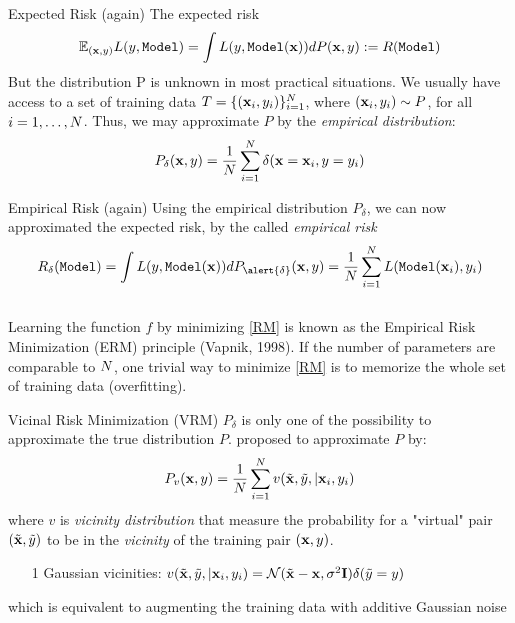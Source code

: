 \documentclass[xcolor=pdftex,dvipsnames,table,mathserif]{beamer}
\begin{document}
\begin{frame}{Expected Risk (again)}
The expected risk
\begin{equation*}
 \mathbb{E}_{(\mathbf{x},y)}  L(y,\texttt{Model}) =  \int L(y,\texttt{Model} (\mathbf{x})) dP(\mathbf{x},y) := R(\texttt{Model} )
\end{equation*}
\pause
But the distribution P is \alert{unknown} in most practical situations. 
\pause
We usually have access to a set of training data $T=\{(\mathbf{x}_i,y_i) \}_{i=1}^{N}$, where $(\mathbf{x}_i,y_i)\sim P$, for all $i=1,\ldots,N$. Thus, we may approximate $P$ by the \emph{empirical distribution}:
\begin{equation*}
P_{\delta}(\mathbf{x},y) = \frac{1}{N}\sum_{i=1}^{N}\delta(\mathbf{x}=\mathbf{x}_i,y=y_i)
\end{equation*}
\end{frame}

\begin{frame}{Empirical Risk (again)}
Using the empirical distribution $P_{\delta}$, we can now approximated the expected risk, by the called \emph{empirical risk}
\begin{equation}\label{RM}
R_{\delta}(\texttt{Model} ) = \int \loss(y,\texttt{Model} (\x)) dP_{\alert{\delta}}(\x,y) = \frac{1}{\nsize}\sum_{i=1}^{\nsize}\loss(\texttt{Model}(\x_i),y_i)
\end{equation} \\
Learning the function $f$ by minimizing \eqref{RM} is known as the Empirical Risk Minimization (ERM) principle \cite{vapnik98} (Vapnik, 1998). If the number of parameters are comparable to $N$, one trivial way to minimize \eqref{RM} is to \alert{memorize} the whole set of training data (overfitting).
\end{frame}

\begin{frame}{Vicinal Risk Minimization (VRM)}
$P_{\delta}$ is only one of the possibility to approximate the true distribution $P$. \cite{chapelle2001vicinal} proposed to approximate $P$ by:
\begin{equation*}
P_{v}(\mathbf{x},y) = \frac{1}{N}\sum_{i=1}^{N}v(\tilde{\mathbf{x}},\tilde{y}, |\mathbf{x}_i,y_i)
\end{equation*}
where $v$ is \emph{vicinity distribution} that measure the probability for a "virtual" pair $(\tilde{\mathbf{x}},\tilde{y})$ to be in the \emph{vicinity} of the training pair $(\mathbf{x},y)$. \pause
\begin{enumerate}
\item[1]  Gaussian vicinities: $v(\tilde{\mathbf{x}},\tilde{y}, |\mathbf{x}_i,y_i)=\mathcal{N}(\tilde{\mathbf{x}}-\mathbf{x},\sigma^2\mathbf{I})\delta(\tilde{y}=y)$
\end{enumerate}
\pause
\alert{which is equivalent to augmenting the training data with additive Gaussian noise}
\end{frame}
\end{document}
